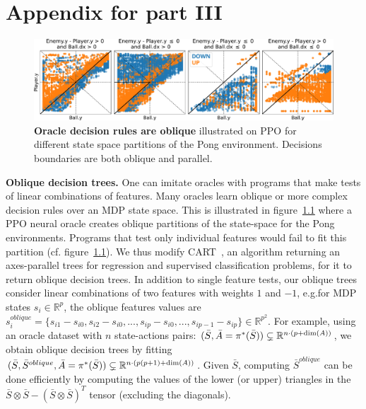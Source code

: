 \chapter{Appendix for part III}
\label{chap-app-imit}
\begin{figure}[b]
    \centering
    \includegraphics[width=1.\textwidth]{images/images_part3/pong_state_space.pdf}
    \caption{\textbf{Oracle decision rules are oblique} illustrated on PPO for different state space partitions of the Pong environment. Decisions boundaries are both oblique and parallel.}
    \label{fig:pong_states}
\end{figure}

\textbf{Oblique decision trees.} One can imitate oracles with programs that make tests of linear combinations of features. Many oracles learn oblique or more complex decision rules over an MDP state space. This is illustrated in figure~\ref{fig:pong_states} where a PPO neural oracle creates oblique partitions of the state-space for the Pong environments. Programs that test only individual features would fail to fit this partition (cf. figure~\ref{fig:pong_states}). 
We thus modify CART~\cite{breiman1984classification}, an algorithm returning an axes-parallel trees for regression and supervised classification problems, for it to return oblique decision trees. 
In addition to single feature tests, our oblique trees consider linear combinations of two features with weights $1$ and $-1$, e.g.\@ for MDP states $s_i \in \mathbb{R}^{p}$, the oblique features values are $s^{oblique}_i = \{s_{i1} - s_{i0}, s_{i2} - s_{i0}, ..., s_{ip} - s_{i0}, ...,s_{ip-1} - s_{ip}\} \in \mathbb{R}^{p^2}$. For example, using an oracle dataset with $n$ state-actions pairs: $(\bar{S}, \Bar{A} = \pi^{*}(\bar{S})) \subsetneq \mathbb{R}^{n\cdot(p+\dim(A))}$, we obtain oblique decision trees by fitting $(\bar{S},\bar{S}^{oblique} , \Bar{A} = \pi^{*}(\bar{S})) \subsetneq \mathbb{R}^{n\cdot(p(p+1)+\dim(A))}$. 
Given $\bar{S}$, computing $\bar{S}^{oblique}$ can be done efficiently by computing the values of the lower (or upper) triangles in the $\bar{S} \otimes \bar{S} - (\bar{S} \otimes \bar{S})^T$ tensor (excluding the diagonals).


